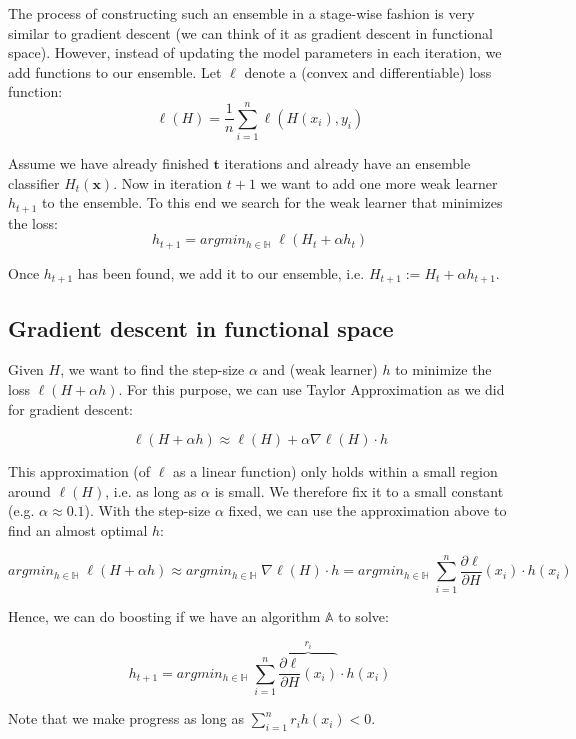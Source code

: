 \documentclass[twoside]{article}
\begin{document}
The process of constructing such an ensemble in a stage-wise fashion is very similar to gradient descent (we can think of it as gradient descent in functional space). However, instead of updating the model parameters in each iteration, we add functions to our ensemble.
Let $\ell$ denote a (convex and differentiable) loss function: 
$$ \ell(H) = \dfrac{1}{n} \sum_{i=1}^{n} \ell(H(x_{i}),y_{i}) $$


Assume we have already finished $\mathbf{t}$ iterations and already have an ensemble classifier $H_{t}(\mathbf{x})$. Now in iteration $t+1$ we want to add one more weak learner $h_{t+1}$ to the ensemble. To this end we search for the weak learner that minimizes the loss:
$$h_{t+1} = argmin_{h \in \mathbb{H}} \; \ell(H_{t} + \alpha h_{t})$$

Once $h_{t+1}$ has been found, we add it to our ensemble, i.e. $H_{t+1} := H_{t} + \alpha h_{t+1}$.


\subsection{Gradient descent in functional space}

Given $H$, we want to find the step-size $\alpha$ and (weak learner) $h$ to minimize the loss $\ell(H + \alpha h)$. For this purpose, we can use Taylor Approximation as we did for gradient descent:

$$  \ell(H + \alpha h) \approx \ell(H) 
+ \alpha \nabla \ell(H) \cdot h$$

This approximation (of $\ell$ as a linear function) only holds within a small region around $\ell(H)$, i.e. as long as $\alpha$ is small. We therefore fix it to a small constant (e.g. $\alpha \approx 0.1$). With the step-size $\alpha$ fixed, we can use the approximation above to find an almost optimal $h$:

$$argmin_{h \in \mathbb{H}} \; \ell(H + \alpha h) \approx argmin_{h \in \mathbb{H}}  \; \nabla \ell(H) \cdot  h = argmin_{h \in \mathbb{H}} \; \sum_{i=1}^{n} \dfrac{\partial \ell}{\partial H} (x_{i}) \cdot h(x_{i})$$ 
\newpage

Hence, we can do boosting if we have an algorithm $\mathbb{A}$ to solve: 

$$h_{t+1} = argmin_{h \in \mathbb{H}} \; \sum_{i=1}^{n} \overbrace{\dfrac{\partial \ell}{\partial H} (x_{i})}^\text{$r_{i}$}  \cdot h(x_{i})$$

Note that we  make progress as long as
$\sum_{i=1}^{n} r_{i} h(x_{i}) < 0$.
\end{document}
